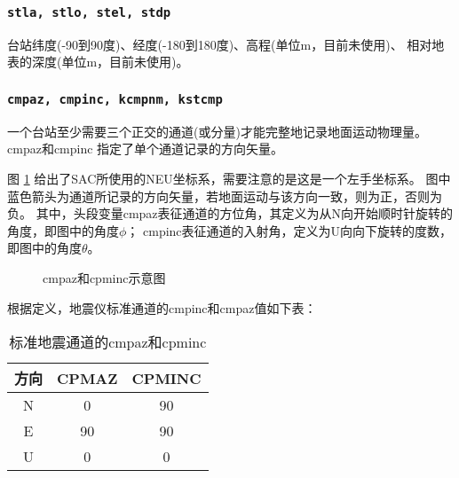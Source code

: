 \subsubsection{\texttt{stla, stlo, stel, stdp}}
台站纬度(-90到90度)、经度(-180到180度)、高程(单位m，目前未使用)、
相对地表的深度(单位m，目前未使用)。

\subsubsection{\texttt{cmpaz, cmpinc, kcmpnm, kstcmp}}
一个台站至少需要三个正交的通道(或分量)才能完整地记录地面运动物理量。cmpaz和cmpinc
指定了单个通道记录的方向矢量。

图 \ref{fig:cmpaz-cmpinc} 给出了SAC所使用的NEU坐标系，需要注意的是这是一个左手坐标系。
图中蓝色箭头为通道所记录的方向矢量，若地面运动与该方向一致，则为正，否则为负。
其中，头段变量cmpaz表征通道的方位角，其定义为从N向开始顺时针旋转的角度，即图中的角度$\phi$；
cmpinc表征通道的入射角，定义为U向向下旋转的度数，即图中的角度$\theta$。

\begin{figure}[H]
\centering
{}
\caption{cmpaz和cpminc示意图}
\label{fig:cmpaz-cmpinc}
\end{figure}

根据定义，地震仪标准通道的cmpinc和cmpaz值如下表：
\begin{table}[H]
\caption{标准地震通道的cmpaz和cpminc}
\label{table:neu-cmpaz-cmpinc}
\centering
\begin{tabular}{ccc}
\toprule
方向    &   CPMAZ   &   CPMINC      \\
\midrule
N       &   0       &   90          \\
E       &   90      &   90          \\
U       &   0       &   0           \\
\bottomrule
\end{tabular}
\end{table}

